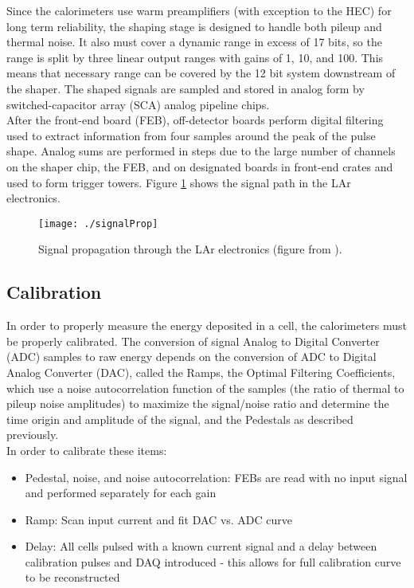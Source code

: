 Since the calorimeters use warm preamplifiers (with exception to the HEC) for long term reliability, the shaping stage is designed to handle both pileup and thermal noise.  It also must cover a dynamic range in excess of 17 bits, so the range is split by three linear output ranges with gains of 1, 10, and 100.  This means that necessary range can be covered by the 12 bit system downstream of the shaper.  The shaped signals are sampled and stored in analog form by switched-capacitor array (SCA) analog pipeline chips.  \\

After the front-end board (FEB), off-detector boards perform digital filtering used to extract information from four samples around the peak of the pulse shape.  Analog sums are performed in steps due to the large number of channels on the shaper chip, the FEB, and on designated boards in front-end crates and used to form trigger towers.  Figure \ref{fig:sigProp} shows the signal path in the LAr electronics.  \\

\begin{figure}[h!]
  \centering
	\texttt{[image: ./signalProp]}
\caption[Signal propagation through the LAr electronics]{\label{fig:sigProp}{ Signal propagation through the LAr electronics (figure from \cite{larPerf}). }} %
\end{figure}

\subsection{Calibration}

In order to properly measure the energy deposited in a cell, the calorimeters must be properly calibrated.  The conversion of signal Analog to Digital Converter (ADC) samples to raw energy depends on the conversion of ADC to Digital Analog Converter (DAC), called the Ramps, the Optimal Filtering Coefficients, which use a noise autocorrelation function of the samples (the ratio of thermal to pileup noise amplitudes) to maximize the signal/noise ratio and determine the time origin and amplitude of the signal, and the Pedestals as described previously. \\


In order to calibrate these items:
\begin{itemize}
	\item Pedestal, noise, and noise autocorrelation: FEBs are read with no input signal and performed separately for each gain
	\item Ramp: Scan input current and fit DAC vs. ADC curve
	\item Delay: All cells pulsed with a known current signal and a delay between calibration pulses and DAQ introduced - this allows for full calibration curve to be reconstructed
\end{itemize}

